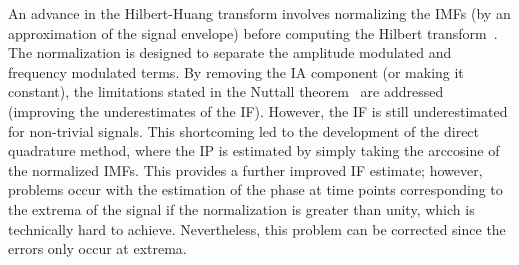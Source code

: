 \documentclass[11pt,draftcls,onecolumn]{IEEEtran}
\begin{document}
An advance in the Hilbert-Huang transform involves normalizing the IMFs (by an approximation of the signal envelope) before computing the Hilbert transform~\cite{Huang2005}. The normalization is designed to separate the amplitude modulated and frequency modulated terms. By removing the IA component (or making it constant), the limitations stated in the Nuttall theorem~\cite{Nuttall1966} are addressed (improving the underestimates of the IF). However, the IF is still underestimated for non-trivial signals. This shortcoming led to the development of the direct quadrature method, where the IP is estimated by simply taking the arccosine of the normalized IMFs. This provides a further improved IF estimate; however, problems occur with the estimation of the phase at time points corresponding to the extrema of the signal if the normalization is greater than unity, which is technically hard to achieve. Nevertheless, this problem can be corrected since the errors only occur at extrema.
\end{document}
